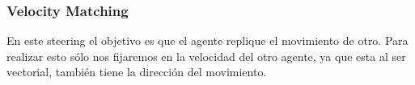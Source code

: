 \subsubsection{Velocity Matching}

En este steering el objetivo es que el agente replique el movimiento de otro. Para realizar esto sólo nos fijaremos en la velocidad del otro agente, ya que esta al ser vectorial, también tiene la dirección del movimiento.


